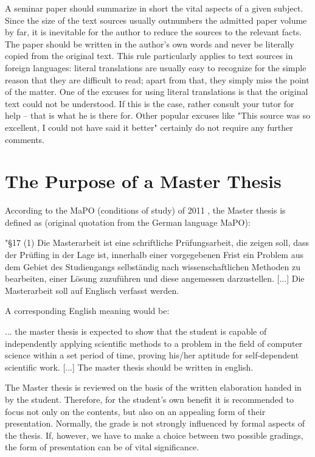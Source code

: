 A seminar paper should summarize in short the vital aspects of a given subject.
Since the size of the text sources usually outnumbers the admitted paper volume by
far, it is inevitable for the author to reduce the sources to the relevant facts.
The paper should be written in the author's own words and never be literally copied
from the original text. This rule particularly applies to text sources in foreign
languages: literal translations are usually easy to recognize for the simple reason
that they are difficult to read; apart from that, they simply miss the point of the
matter. One of the excuses for using literal translations is that the original text
could not be understood. If this is the case, rather consult your tutor for help --
that is what he is there for. Other popular excuses like "This source was so
excellent, I could not have said it better" certainly do not require any further comments.


\section{The Purpose of a Master Thesis}
\label{sec:aufgaben-diplom}

According to the MaPO (conditions of study) of 2011 \cite{mpo11}, the Master thesis is defined as (original quotation from the German language MaPO):

\begin{bigquote}{\cite{mpo11}}
  "\S 17 (1) Die Masterarbeit ist eine schriftliche Prüfungsarbeit, die zeigen soll, dass der Prüfling in der Lage ist, innerhalb einer vorgegebenen Frist ein Problem aus dem Gebiet des Studiengangs selbständig nach wissenschaftlichen Methoden zu bearbeiten, einer Lösung zuzuführen und diese angemessen darzustellen. [...] Die Masterarbeit soll auf Englisch verfasst werden. 
\end{bigquote}

A corresponding English meaning would be:
\begin{bigquote}
 ... the master thesis is expected to show that the student is capable of 
  independently applying scientific methods to a problem in the field of computer science within a set period of time,
  proving his/her aptitude for self-dependent scientific work. [...] The master thesis should be written in english.
\end{bigquote}

The Master thesis is reviewed on the basis of the written elaboration handed in by
the student. Therefore, for the student's own benefit it is recommended to focus not
only on the contents, but also on an appealing form of their presentation. Normally,
the grade is not strongly influenced by formal aspects of the thesis. If, however,
we have to make a choice between two possible gradings, the form of presentation can
be of vital significance.


